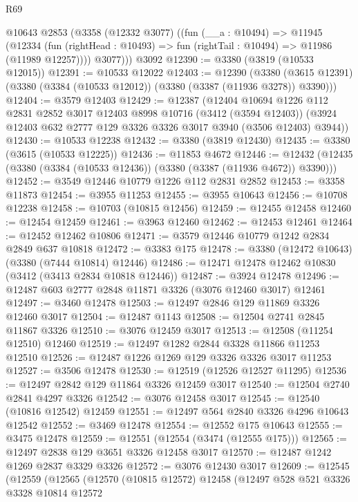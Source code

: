 \begin{lexlean}{R69}
\begin{coremodule}
      @10643
      @2853
      (@3358
        (@12332 @3077)
        ((fun (__a : @10494) =>
        @11945
          (@12334 (fun (rightHead : @10493) => fun (rightTail : @10494) => @11986 (@11989 @12257))))
          @3077)))
    @3092
@12390 := @3380 (@3819 (@10533 @12015))
@12391 := @10533 @12022
@12403 := @12390
    (@3380 (@3615 @12391) (@3380 (@3384 (@10533 @12012)) (@3380 (@3387 (@11936 @3278)) @3390)))
@12404 := @3579 @12403
@12429 := @12387
    (@12404
      @10694
      @1226
      @112
      @2831
      @2852
      @3017
      @12403
      @8998
      @10716
      (@3412 (@3594 @12403))
      (@3924 @12403 @632 @2777 @129 @3326 @3326 @3017 @3940 (@3506 @12403) @3944))
@12430 := @10533 @12238
@12432 := @3380 (@3819 @12430)
@12435 := @3380 (@3615 (@10533 @12225))
@12436 := @11853 @4672
@12446 := @12432 (@12435 (@3380 (@3384 (@10533 @12436)) (@3380 (@3387 (@11936 @4672)) @3390)))
@12452 := @3549 @12446 @10779 @1226 @112 @2831 @2852
@12453 := @3358 @11873
@12454 := @3955 @11253
@12455 := @3955 @10643
@12456 := @10708 @12238
@12458 := @10703 (@10815 @12456)
@12459 := @12455 @12458
@12460 := @12454 @12459
@12461 := @3963 @12460
@12462 := @12453 @12461
@12464 := @12452 @12462 @10806
@12471 := @3579 @12446 @10779 @1242 @2834 @2849 @637 @10818
@12472 := @3383 @175
@12478 := @3380 (@12472 @10643) (@3380 (@7444 @10814) @12446)
@12486 := @12471 @12478 @12462 @10830 (@3412 (@3413 @2834 @10818 @12446))
@12487 := @3924 @12478
@12496 := @12487 @603 @2777 @2848 @11871 @3326 (@3076 @12460 @3017) @12461
@12497 := @3460 @12478
@12503 := @12497 @2846 @129 @11869 @3326 @12460 @3017
@12504 := @12487 @1143
@12508 := @12504 @2741 @2845 @11867 @3326
@12510 := @3076 @12459 @3017
@12513 := @12508 (@11254 @12510) @12460
@12519 := @12497 @1282 @2844 @3328 @11866 @11253 @12510
@12526 := @12487 @1226 @1269 @129 @3326 @3326 @3017 @11253
@12527 := @3506 @12478
@12530 := @12519 (@12526 @12527 @11295)
@12536 := @12497 @2842 @129 @11864 @3326 @12459 @3017
@12540 := @12504 @2740 @2841 @4297 @3326
@12542 := @3076 @12458 @3017
@12545 := @12540 (@10816 @12542) @12459
@12551 := @12497 @564 @2840 @3326 @4296 @10643 @12542
@12552 := @3469 @12478
@12554 := @12552 @175 @10643
@12555 := @3475 @12478
@12559 := @12551 (@12554 (@3474 (@12555 @175)))
@12565 := @12497 @2838 @129 @3651 @3326 @12458 @3017
@12570 := @12487 @1242 @1269 @2837 @3329 @3326
@12572 := @3076 @12430 @3017
@12609 := @12545
    (@12559
      (@12565
        (@12570
          (@10815 @12572)
          @12458
          (@12497
            @528
            @521
            @3326
            @3328
            @10814
            @12572

\end{coremodule}
\end{lexlean}
